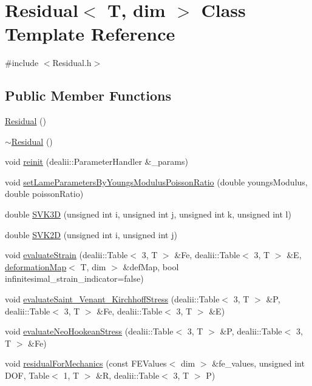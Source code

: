 \section{Residual$<$ T, dim $>$ Class Template Reference}
\label{class_residual}


{\ttfamily \#include $<$Residual.\-h$>$}

\subsection*{Public Member Functions}
\begin{DoxyCompactItemize}
\item 
\hyperlink{class_residual_a4b540ba8e3ad0a1f8cfe2b4acd20493b}{Residual} ()
\item 
\hyperlink{class_residual_a8eef8c757003dd763b7dddc733f65641}{$\sim$\-Residual} ()
\item 
void \hyperlink{class_residual_a683e96e9d88d46820c0964786424fdf2}{reinit} (dealii\-::\-Parameter\-Handler \&\-\_\-params)
\item 
void \hyperlink{class_residual_a74a86942f009e483e946ac0a0036bd71}{set\-Lame\-Parameters\-By\-Youngs\-Modulus\-Poisson\-Ratio} (double youngs\-Modulus, double poisson\-Ratio)
\item 
double \hyperlink{class_residual_a10e7144d5c4746f15a48d506830790cb}{S\-V\-K3\-D} (unsigned int i, unsigned int j, unsigned int k, unsigned int l)
\item 
double \hyperlink{class_residual_abd1627afa72ac735e6907067e1d47bb6}{S\-V\-K2\-D} (unsigned int i, unsigned int j)
\item 
void \hyperlink{class_residual_a4b181b84ebad5e2adb629b4a542dc9c6}{evaluate\-Strain} (dealii\-::\-Table$<$ 3, T $>$ \&Fe, dealii\-::\-Table$<$ 3, T $>$ \&E, \hyperlink{structdeformation_map}{deformation\-Map}$<$ T, dim $>$ \&def\-Map, bool infinitesimal\-\_\-strain\-\_\-indicator=false)
\item 
void \hyperlink{class_residual_a4215ec5a6eabd7573e0caeee6fd194ad}{evaluate\-Saint\-\_\-\-Venant\-\_\-\-Kirchhoff\-Stress} (dealii\-::\-Table$<$ 3, T $>$ \&P, dealii\-::\-Table$<$ 3, T $>$ \&Fe, dealii\-::\-Table$<$ 3, T $>$ \&E)
\item 
void \hyperlink{class_residual_a0f9ff6a237d377803ce368b26ca39652}{evaluate\-Neo\-Hookean\-Stress} (dealii\-::\-Table$<$ 3, T $>$ \&P, dealii\-::\-Table$<$ 3, T $>$ \&Fe)
\item 
void \hyperlink{class_residual_a432fe02216f182fd241f09775131f854}{residual\-For\-Mechanics} (const F\-E\-Values$<$ dim $>$ \&fe\-\_\-values, unsigned int D\-O\-F, Table$<$ 1, T $>$ \&R, dealii\-::\-Table$<$ 3, T $>$ P)

\end{DoxyCompactItemize}
